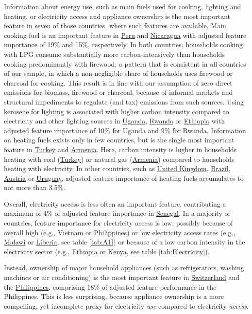\documentclass[12pt, a4paper]{article}
\begin{document}
Information about energy use, such as main fuels used for cooking, lighting and heating, or electricity access and appliance ownership is the most important feature in seven of those countries, where such features are available. Main cooking fuel is an important feature in \hyperref[fig:5b_PER]{Peru} and \hyperref[fig:5b_NIC]{Nicaragua} with adjusted feature importance of 19\% and 15\%, respectively. In both countries, households cooking with LPG consume substantially more carbon-intensively than households cooking predominantly with firewood, a pattern that is consistent in all countries of our sample, in which a non-negligible share of households uses firewood or charcoal for cooking. This result is in line with our assumption of zero direct emissions for biomass, firewood or charcoal, because of informal markets and structural impediments to regulate (and tax) emissions from such sources. Using kerosene for lighting is associated with higher carbon intensity compared to electricity and other lighting sources in \hyperref[fig:5b_UGA]{Uganda}, \hyperref[fig:5b_RWA]{Rwanda} or \hyperref[fig:5b_ETH]{Ethiopia} with adjusted feature importance of 10\% for Uganda and 9\% for Rwanda. Information on heating fuels exists only in few countries, but is the single most important feature in \hyperref[fig:5b_TUR]{Turkey} and \hyperref[fig:5b_ARM]{Armenia}. Here, carbon intensity is higher in households heating with coal (\hyperref[fig:5b_TUR]{Turkey}) or natural gas (\hyperref[fig:5b_ARM]{Armenia}) compared to households heating with electricity. In other countries, such as \hyperref[fig:5b_GBR]{United Kingdom}, \hyperref[fig:5b_BRA]{Brazil}, \hyperref[fig:5b_AUT]{Austria} or \hyperref[fig:5b_URY]{Uruguay}, adjusted feature importance of heating fuels accumulates to not more than 3.5\%.

Overall, electricity access is less often an important feature, contributing a maximum of 4\% of adjusted feature importance in \hyperref[fig:5b_SEN]{Senegal}. In a majority of countries, feature importance for electricity access is low, possibly because of overall high (e.g., \hyperref[fig:5b_VNM]{Vietnam} or \hyperref[fig:5b_PHL]{Philippines}) or low electricity access rates (e.g., \hyperref[fig:5b_MWI]{Malawi} or \hyperref[fig:5b_LBR]{Liberia}, see table \ref{tab:A1}) or because of a low carbon intensity in the electricity sector (e.g., \hyperref[fig:5b_ETH]{Ethiopia} or \hyperref[fig:5b_KEN]{Kenya}, see table \ref{tab:Electricity}).

Instead, ownership of major household appliances (such as refrigerators, washing machines or air conditioning) is the most important feature in \hyperref[fig:5b_CHE]{Switzerland} and the \hyperref[fig:5b_PHL]{Philippines}, comprising 18\% of adjusted feature performance in the Philippines. This is less surprising, because appliance ownership is a more compelling, yet incomplete proxy for electricity \textit{use} compared to electricity \textit{access}.
\end{document}
